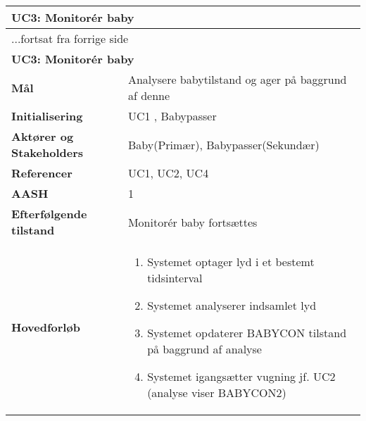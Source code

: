 \begin{center} \centering \label{kravspec:uc3}
	\begin{longtable}{|p{5cm}|p{9cm}|}  %
	\hline
		\multicolumn{2}{|l|}{\textbf{UC3: Monitorér baby}} \\\hline %
		\endfirsthead
		
		\multicolumn{2}{l}{...fortsat fra forrige side} \\ \hline %
		\multicolumn{2}{|l|}{\textbf{UC3: Monitorér baby}} \\\hline %
		\endhead	
		
		\textbf{Mål}							&Analysere babytilstand og ager på baggrund af denne	\\\hline
		\textbf{Initialisering}				&UC1	, Babypasser	\\\hline
		\textbf{Aktører og Stakeholders}		&Baby(Primær), Babypasser(Sekundær)		\\\hline 
		\textbf{Referencer}					&UC1, UC2, UC4		\\\hline
		\textbf{AASH}						&1		\\\hline
		\textbf{Efterfølgende tilstand}		&Monitorér baby fortsættes		\\\hline
		\textbf{Hovedforløb}					
			&\begin{enumerate}
					
				\item \label{kravspec:uc3_optagelse}Systemet optager lyd i et bestemt tidsinterval 				
				\newline [Und: \ref{kravspec:uc3_optagelse}.a Fejl ved lydoptagelse]
				
				\item Systemet analyserer indsamlet lyd 
				
				\item Systemet opdaterer BABYCON tilstand på baggrund af analyse
				
				\item \label{kravspec:uc3_lydanalyse}Systemet igangsætter vugning jf. UC2 (analyse viser BABYCON2)			
				\newline [Und: \ref{kravspec:uc3_lydanalyse}.a Vugning allerede igang (forrige analyse viste BABYCON2)]
				\newline [Und: \ref{kravspec:uc3_lydanalyse}.b Analyse viser BABYCON3 (forrige analyse viste BABYCON2)]
				\newline [Und: \ref{kravspec:uc3_lydanalyse}.c Analyse viser BABYCON3 (forrige analyse viste BABYCON3)]
				\newline [Und: \ref{kravspec:uc3_lydanalyse}.d Analyse viser BABYCON1]
				

\end{enumerate}
\end{longtable}
\end{center}
